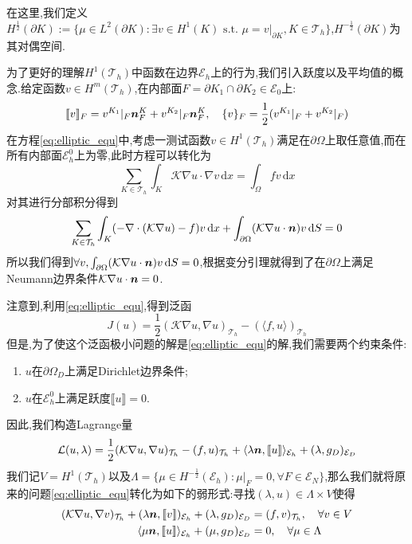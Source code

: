 在这里,我们定义$H^{\frac{1}{2}}(\partial K):=\{\mu\in L^2(\partial K):\exists v\in H^1(K)\text{ s.t. }\mu=v|_{\partial K},K\in \mathcal{T}_h\}$,$H^{-\frac{1}{2}}(\partial K)$为其对偶空间.\par
为了更好的理解$H^1(\mathcal{T}_h)$中函数在边界$\mathcal{E}_h$上的行为,我们引入跃度以及平均值的概念.给定函数$v\in H^m(\mathcal{T}_h)$,在内部面$F=\partial K_1\cap \partial K_2\in \mathcal{E}_0$上:
$$
\llbracket v\rrbracket_F=v^{K_1}|_F\bm{n}^K_F+v^{K_2}|_F\bm{n}^K_F,\quad \{v\}_F=\frac{1}{2}(v^{K_1}|_{F}+v^{K_2}|_{F})
$$
\qquad 在方程\eqref{eq:elliptic_equ}中,考虑一测试函数$v\in H^1(\mathcal{T}_h)$满足在$\partial\Omega$上取任意值,而在所有内部面$\mathcal{E}_h^0$上为零,此时方程可以转化为
$$
\sum_{K\in\mathcal{T}_h}\int_K \mathcal{K}\nabla u\cdot\nabla v\,\mathrm{d}x=\int_\Omega fv\,\mathrm{d}x
$$
对其进行分部积分得到
$$
\sum_{K\in\mathcal{T}_h}\int_K (-\nabla\cdot(\mathcal{K}\nabla u)-f)v\,\mathrm{d}x+\int_{\partial\Omega} (\mathcal{K}\nabla u\cdot\bm{n})v\,\mathrm{d}S=0
$$
所以我们得到$\forall v,\int_{\partial\Omega} (\mathcal{K}\nabla u\cdot\bm{n})v\,\mathrm{d}S=0$,根据变分引理就得到了在$\partial\Omega$上满足Neumann边界条件$\mathcal{K}\nabla u\cdot\bm{n}=0$.\par
注意到,利用\eqref{eq:elliptic_equ},得到泛函
$$
J(u)=\frac{1}{2}(\mathcal{K}\nabla u,\nabla u)_{\mathcal{T}_h}-(\langle f,u\rangle)_{\mathcal{T}_h}
$$
但是,为了使这个泛函极小问题的解是\eqref{eq:elliptic_equ}的解,我们需要两个约束条件:
\begin{enumerate}
    \item $u$在$\partial\Omega_D$上满足Dirichlet边界条件;
    \item $u$在$\mathcal{E}_h^0$上满足跃度$\llbracket u\rrbracket=0$.
\end{enumerate}
因此,我们构造Lagrange量
$$
\mathcal{L}(u,\lambda)=\frac{1}{2}(\mathcal{K}\nabla u,\nabla u)_{\mathcal{T}_h}-(f,u)_{\mathcal{T}_h}+\langle \lambda\bm{n},\llbracket u\rrbracket\rangle_{\mathcal{E}_h}+(\lambda,g_D)_{\mathcal{E}_D}
$$
\qquad 我们记$V=H^1(\mathcal{T}_h)$以及$\Lambda=\{\mu\in H^{-\frac{1}{2}}(\mathcal{E}_h):\mu|_F=0,\forall F\in\mathcal{E}_N\}$,那么我们就将原来的问题\eqref{eq:elliptic_equ}转化为如下的弱形式:寻找$(\lambda,u)\in \Lambda\times V$使得
\begin{align}
    (\mathcal{K}\nabla u,\nabla v)_{\mathcal{T}_h}+(\lambda\bm{n},\llbracket v\rrbracket)_{\mathcal{E}_h}+(\lambda,g_D)_{\mathcal{E}_D}&=(f,v)_{\mathcal{T}_h},\quad \forall v\in V\label{eq:1.4}\\
    \langle \mu\bm{n},\llbracket u\rrbracket\rangle_{\mathcal{E}_h}+(\mu,g_D)_{\mathcal{E}_D}&=0,\quad \forall \mu\in \Lambda\label{eq:1.5}
\end{align}


